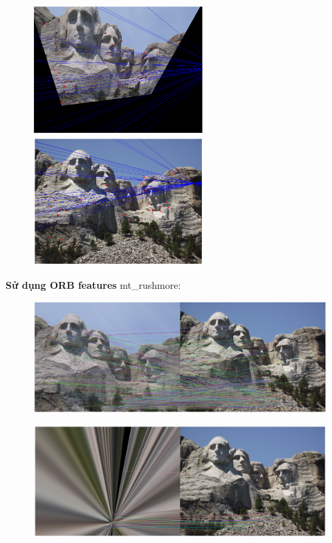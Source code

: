 \documentclass[11pt]{article}
\begin{document}
\begin{figure}[H]
    \centering
    \includegraphics[width=6.5cm]{images/part3/no_ransac_image_1_noise_0.4_left.png}
    \includegraphics[width=6.5cm]{images/part3/no_ransac_image_1_noise_0.4_right.png}
\end{figure}


\textbf{Sử dụng ORB features}
mt\_rushmore:
\begin{figure}[H]
    \centering
    \includegraphics[width=14cm]{images/part3/orb_image_1_0.png}
\end{figure}
\begin{figure}[H]
    \centering
    \includegraphics[width=14cm]{images/part3/orb_image_1_1.png}
\end{figure}
\end{document}
